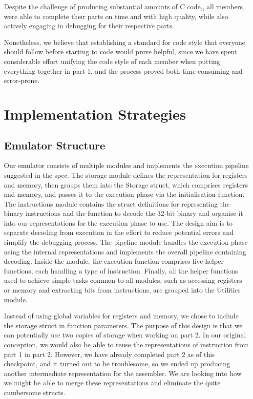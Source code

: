 \documentclass[a4paper, 9pt]{article}
\begin{document}
Despite the challenge of producing substantial amounts of C code,, all members were able to complete their parts on time and with high quality,
while also actively engaging in debugging for their respective parts.

Nonetheless, we believe that establishing a standard for code style that everyone should follow before starting to code would prove helpful,
since we have spent considerable effort unifying the code style of each member when putting everything together in part 1,
and the process proved both time-consuming and error-prone.

\section{Implementation Strategies}

\subsection{Emulator Structure}

Our emulator consists of multiple modules and implements the execution pipeline suggested in the spec.
The storage module defines the representation for registers and memory, then groups them into the Storage struct,
which comprises registers and memory, and passes it to the execution phase via the initialisation function.
The instructions module contains the struct definitions for representing the binary instructions and the function to decode the 32-bit binary and organise it into our representations for the execution phase to use.
The design aim is to separate decoding from execution in the effort to reduce potential errors and simplify the debugging process.
The pipeline module handles the execution phase using the internal representations and implements the overall pipeline containing decoding.
Inside the module, the execution function comprises five helper functions, each handling a type of instruction.
Finally, all the helper functions used to achieve simple tasks common to all modules, such as accessing registers or memory and extracting bits from instructions, are grouped into the Utilities module.

Instead of using global variables for registers and memory, we chose to include the storage struct in function parameters.
The purpose of this design is that we can potentially use two copies of storage when working on part 2.
In our original conception, we would also be able to reuse the representations of instruction from part 1 in part 2. However, we have already completed part 2 as of this checkpoint, and it turned out to be troublesome,
so we ended up producing another intermediate representation for the assembler.
We are looking into how we might be able to merge these representations and eliminate the quite cumbersome structs.
\end{document}
